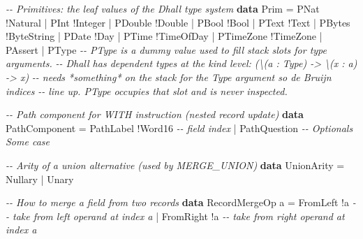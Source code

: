 \documentclass[]{article}
\newenvironment{Shaded}{}{}
\newcommand{\CommentTok}[1]{\textcolor[rgb]{0.38,0.63,0.69}{\textit{#1}}}
\newcommand{\DataTypeTok}[1]{\textcolor[rgb]{0.56,0.13,0.00}{#1}}
\newcommand{\KeywordTok}[1]{\textcolor[rgb]{0.00,0.44,0.13}{\textbf{#1}}}
\newcommand{\NormalTok}[1]{#1}
\newcommand{\OperatorTok}[1]{\textcolor[rgb]{0.40,0.40,0.40}{#1}}
\newcommand{\OtherTok}[1]{\textcolor[rgb]{0.00,0.44,0.13}{#1}}
\begin{document}
\begin{Shaded}
\begin{Highlighting}[]
\CommentTok{{-}{-} Primitives: the leaf values of the Dhall type system}
\KeywordTok{data} \DataTypeTok{Prim}
    \OtherTok{=} \DataTypeTok{PNat} \OperatorTok{!}\DataTypeTok{Natural}
    \OperatorTok{|} \DataTypeTok{PInt} \OperatorTok{!}\DataTypeTok{Integer}
    \OperatorTok{|} \DataTypeTok{PDouble} \OperatorTok{!}\DataTypeTok{Double}
    \OperatorTok{|} \DataTypeTok{PBool} \OperatorTok{!}\DataTypeTok{Bool}
    \OperatorTok{|} \DataTypeTok{PText} \OperatorTok{!}\DataTypeTok{Text}
    \OperatorTok{|} \DataTypeTok{PBytes} \OperatorTok{!}\DataTypeTok{ByteString}
    \OperatorTok{|} \DataTypeTok{PDate} \OperatorTok{!}\DataTypeTok{Day}
    \OperatorTok{|} \DataTypeTok{PTime} \OperatorTok{!}\DataTypeTok{TimeOfDay}
    \OperatorTok{|} \DataTypeTok{PTimeZone} \OperatorTok{!}\DataTypeTok{TimeZone}
    \OperatorTok{|} \DataTypeTok{PAssert}
    \OperatorTok{|} \DataTypeTok{PType}
    \CommentTok{{-}{-} PType is a dummy value used to fill stack slots for type arguments.}
    \CommentTok{{-}{-} Dhall has dependent types at the kind level: (\textbackslash{}(a : Type) {-}\textgreater{} \textbackslash{}(x : a) {-}\textgreater{} x)}
    \CommentTok{{-}{-} needs *something* on the stack for the Type argument so de Bruijn indices}
    \CommentTok{{-}{-} line up. PType occupies that slot and is never inspected.}

\CommentTok{{-}{-} Path component for WITH instruction (nested record update)}
\KeywordTok{data} \DataTypeTok{PathComponent}
    \OtherTok{=} \DataTypeTok{PathLabel} \OperatorTok{!}\DataTypeTok{Word16}  \CommentTok{{-}{-} field index}
    \OperatorTok{|} \DataTypeTok{PathQuestion}       \CommentTok{{-}{-} Optional\textquotesingle{}s Some case}

\CommentTok{{-}{-} Arity of a union alternative (used by MERGE\_UNION)}
\KeywordTok{data} \DataTypeTok{UnionArity} \OtherTok{=} \DataTypeTok{Nullary} \OperatorTok{|} \DataTypeTok{Unary}

\CommentTok{{-}{-} How to merge a field from two records}
\KeywordTok{data} \DataTypeTok{RecordMergeOp}\NormalTok{ a}
    \OtherTok{=} \DataTypeTok{FromLeft} \OperatorTok{!}\NormalTok{a    }\CommentTok{{-}{-} take from left operand at index a}
    \OperatorTok{|} \DataTypeTok{FromRight} \OperatorTok{!}\NormalTok{a   }\CommentTok{{-}{-} take from right operand at index a}


\end{Highlighting}
\end{Shaded}
\end{document}
